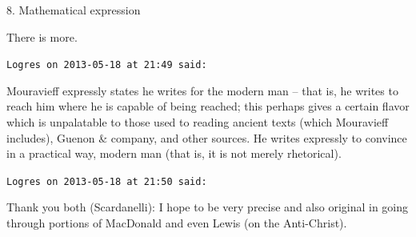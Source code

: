 \begin{footnotesize}
\begin{sffamily}
8. Mathematical expression

There is more.

\hfill

\texttt{Logres on 2013-05-18 at 21:49 said:}

Mouravieff expressly states he writes for the modern man -- that is, he writes to reach him where he is capable of being reached; this perhaps gives a certain flavor which is unpalatable to those used to reading ancient texts (which Mouravieff includes), Guenon \& company, and other sources. He writes expressly to convince in a practical way, modern man (that is, it is not merely rhetorical).

\hfill

\texttt{Logres on 2013-05-18 at 21:50 said:}

Thank you both (Scardanelli): I hope to be very precise and also original in going through portions of MacDonald and even Lewis (on the Anti-Christ).

\hfill

\end{sffamily}
\end{footnotesize}


